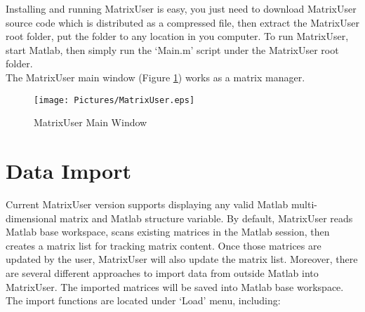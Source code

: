 \documentclass{article}%
\begin{document}
Installing and running MatrixUser is easy, you just need to download MatrixUser source code which is distributed as a compressed file, then extract the MatrixUser root folder, put the folder to any location in you computer. To run MatrixUser, start Matlab, then simply run the `Main.m' script under the MatrixUser root folder. \\

The MatrixUser main window (Figure \ref{fig:MatrixUser}) works as a matrix manager.

\begin{figure}[htbp]
	\centering
		\texttt{[image: Pictures/MatrixUser.eps]}
	\caption{MatrixUser Main Window}
	\label{fig:MatrixUser}
\end{figure}


\section{Data Import}

Current MatrixUser version supports displaying any valid Matlab multi-dimensional matrix and Matlab structure variable. By default, MatrixUser reads Matlab base workspace, scans existing matrices in the Matlab session, then creates a matrix list for tracking matrix content. Once those matrices are updated by the user, MatrixUser will also update the matrix list. Moreover, there are several different approaches to import data from outside Matlab into MatrixUser. The imported matrices will be saved into Matlab base workspace. The import functions are located under `Load' menu, including:
\end{document}
